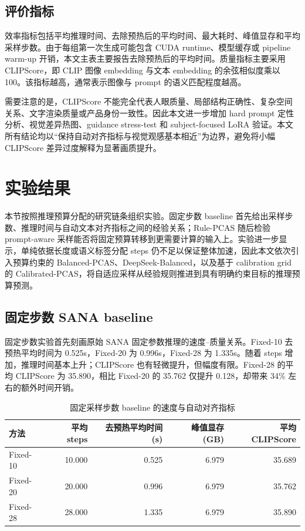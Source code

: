 \documentclass[UTF8,zihao=-4,fontset=fandol]{ctexart}
\newcommand{\clipscore}{\textrm{CLIPScore}}
\begin{document}
\subsection{评价指标}

效率指标包括平均推理时间、去除预热后的平均时间、最大耗时、峰值显存和平均采样步数。由于每组第一次生成可能包含 CUDA runtime、模型缓存或 pipeline warm-up 开销，本文主表主要报告去除预热后的平均时间。质量指标主要采用 \clipscore{}，即 CLIP 图像 embedding 与文本 embedding 的余弦相似度乘以 100。该指标越高，通常表示图像与 prompt 的语义匹配程度越高。

需要注意的是，\clipscore{} 不能完全代表人眼质量、局部结构正确性、复杂空间关系、文字渲染质量或产品身份一致性。因此本文进一步增加 hard prompt 定性分析、视觉差异热图、guidance stress-test 和 subject-focused LoRA 验证。本文所有结论均以“保持自动对齐指标与视觉观感基本相近”为边界，避免将小幅 \clipscore{} 差异过度解释为显著画质提升。

\section{实验结果}

本节按照推理预算分配的研究链条组织实验。固定步数 baseline 首先给出采样步数、推理时间与自动文本对齐指标之间的经验关系；Rule-PCAS 随后检验 prompt-aware 采样能否将固定预算转移到更需要计算的输入上。实验进一步显示，单纯依据长度或语义标签分配 steps 仍不足以保证整体加速，因此本文依次引入预算约束的 Balanced-PCAS、DeepSeek-Balanced，以及基于 calibration grid 的 Calibrated-PCAS，将自适应采样从经验规则推进到具有明确约束目标的推理预算预测。

\subsection{固定步数 SANA baseline}

固定步数实验首先刻画原始 SANA 固定参数推理的速度--质量关系。Fixed-10 去预热平均时间为 0.525s，Fixed-20 为 0.996s，Fixed-28 为 1.335s。随着 steps 增加，推理时间基本上升；\clipscore{} 也有轻微提升，但幅度有限。Fixed-28 的平均 \clipscore{} 为 35.890，相比 Fixed-20 的 35.762 仅提升 0.128，却带来 34\% 左右的额外时间开销。

\begin{table}[H]
  \centering
  \caption{固定采样步数 baseline 的速度与自动对齐指标}
  \label{tab:fixed_baseline}
  \begin{tabular}{lrrrr}
    \toprule
    方法 & 平均 steps & 去预热平均时间(s) & 峰值显存(GB) & 平均 \clipscore{} \\
    \midrule
    Fixed-10 & 10.000 & 0.525 & 6.979 & 35.689 \\
    Fixed-20 & 20.000 & 0.996 & 6.979 & 35.762 \\
    Fixed-28 & 28.000 & 1.335 & 6.979 & 35.890 \\
    \bottomrule
  \end{tabular}
\end{table}
\end{document}
